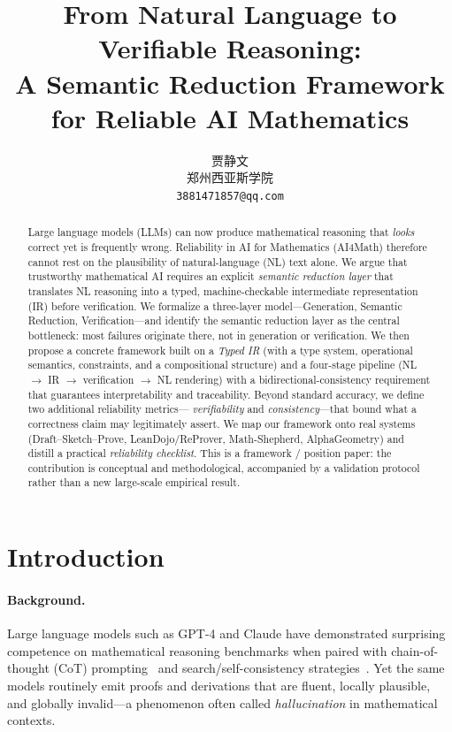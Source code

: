 \documentclass[11pt]{article}
\title{From Natural Language to Verifiable Reasoning:\\
A Semantic Reduction Framework for Reliable AI Mathematics}
\author{贾静文\\
郑州西亚斯学院\\
\texttt{3881471857@qq.com}}
\date{}
\begin{document}
\maketitle

\begin{abstract}
Large language models (LLMs) can now produce mathematical reasoning that \emph{looks}
correct yet is frequently wrong. Reliability in AI for Mathematics (AI4Math) therefore
cannot rest on the plausibility of natural-language (NL) text alone. We argue that
trustworthy mathematical AI requires an explicit \emph{semantic reduction layer} that
translates NL reasoning into a typed, machine-checkable intermediate representation
(IR) before verification. We formalize a three-layer model---Generation, Semantic
Reduction, Verification---and identify the semantic reduction layer as the central
bottleneck: most failures originate there, not in generation or verification. We then
propose a concrete framework built on a \emph{Typed IR} (with a type system, operational
semantics, constraints, and a compositional structure) and a four-stage pipeline
(NL $\rightarrow$ IR $\rightarrow$ verification $\rightarrow$ NL rendering) with a
bidirectional-consistency requirement that guarantees interpretability and
traceability. Beyond standard accuracy, we define two additional reliability metrics---
\emph{verifiability} and \emph{consistency}---that bound what a correctness claim may
legitimately assert. We map our framework onto real systems (Draft--Sketch--Prove,
LeanDojo/ReProver, Math-Shepherd, AlphaGeometry) and distill a practical
\emph{reliability checklist}. This is a framework / position paper: the contribution is
conceptual and methodological, accompanied by a validation protocol rather than a new
large-scale empirical result.
\end{abstract}

\section{Introduction}
\label{sec:intro}

\paragraph{Background.}
Large language models such as GPT-4 and Claude have demonstrated surprising competence
on mathematical reasoning benchmarks when paired with chain-of-thought (CoT)
prompting~\cite{wei2022chain} and search/self-consistency
strategies~\cite{yao2023tree}. Yet the same models routinely emit proofs and derivations
that are fluent, locally plausible, and globally invalid---a phenomenon often called
\emph{hallucination} in mathematical contexts.
\end{document}
